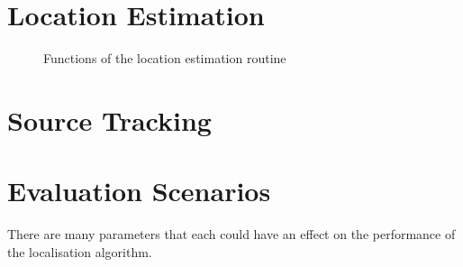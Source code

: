 %

\section{Location Estimation}
\begin{figure}[H]
	\centering
	
	\caption{Functions of the location estimation routine}
	\label{diag:locEstFunc}
\end{figure}



\section{Source Tracking}
\section{Evaluation Scenarios}
There are many parameters that each could have an effect on the performance of the localisation algorithm.

